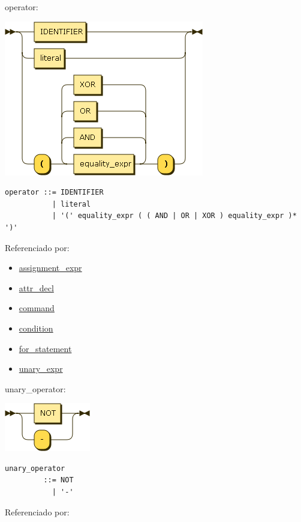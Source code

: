 \clearpage
\protect\hypertarget{operator}{}{operator:}

\includegraphics[width=3.43750in,height=2.66667in]{diagram/operator.png}

\begin{verbatim}
operator ::= IDENTIFIER
           | literal
           | '(' equality_expr ( ( AND | OR | XOR ) equality_expr )* ')'
\end{verbatim}

Referenciado por:

\begin{itemize}
\tightlist
\item
  \protect\hyperlink{assignment_expr}{assignment\_expr}
\item
  \protect\hyperlink{attr_decl}{attr\_decl}
\item
  \protect\hyperlink{command}{command}
\item
  \protect\hyperlink{condition}{condition}
\item
  \protect\hyperlink{for_statement}{for\_statement}
\item
  \protect\hyperlink{unary_expr}{unary\_expr}
\end{itemize}

\protect\hypertarget{unary_operator}{}{unary\_operator:}

\includegraphics[width=1.47917in,height=0.83333in]{diagram/unary_operator.png}

\begin{verbatim}
unary_operator
         ::= NOT
           | '-'
\end{verbatim}

Referenciado por:

